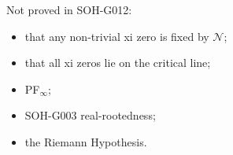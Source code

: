 Not proved in SOH-G012:
\begin{itemize}
 \item that any non-trivial xi zero is fixed by \(\mathcal N\);
 \item that all xi zeros lie on the critical line;
 \item PF\(_\infty\);
 \item SOH-G003 real-rootedness;
 \item the Riemann Hypothesis.
\end{itemize}
